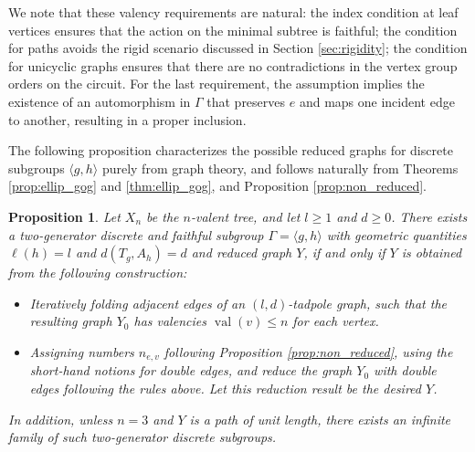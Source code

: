 \documentclass[12pt,leqno]{amsart}
\newcommand{\2}{L^2_{\rm per}(0, T)}
\newtheorem{prop}{Proposition}[section]
\newcommand{\val}{{\operatorname{val}}}
\numberwithin{equation}{section}
\numberwithin{figure}{section}
\begin{document}
We note that these valency requirements are natural: the index condition at leaf vertices ensures that the action on the minimal subtree is faithful; the condition for paths avoids the rigid scenario discussed in Section \ref{sec:rigidity}; the condition for unicyclic graphs ensures that there are no contradictions in the vertex group orders on the circuit. For the last requirement, the assumption implies the existence of an automorphism in $\Gamma$ that preserves $e$ and maps one incident edge to another, resulting in a proper inclusion.

The following proposition characterizes the possible reduced graphs for discrete subgroups $\langle g,h\rangle$ purely from graph theory, and follows naturally from Theorems \ref{prop:ellip_gog} and \ref{thm:ellip_gog}, and Proposition \ref{prop:non_reduced}.
\begin{prop}\label{char:ellip_gog}
    Let $X_n$ be the $n$-valent tree, and let $l\geq 1$ and $d\geq 0$. There exists a two-generator discrete and faithful subgroup $\Gamma = \langle g,h\rangle$ with geometric quantities $\ell(h) = l$ and $d(T_g,A_h) = d$ and reduced graph $Y$, if and only if $Y$ is obtained from the following construction:
    \begin{itemize}
        \item Iteratively folding adjacent edges of an $(l,d)$-tadpole graph, such that the resulting graph $Y_0$ has valencies $\val(v)\leq n$ for each vertex.
        \item Assigning numbers $n_{e,v}$ following Proposition \ref{prop:non_reduced}, using the short-hand notions for double edges, and reduce the graph $Y_0$ with double edges following the rules above. Let this reduction result be the desired $Y$.
    \end{itemize}
    In addition, unless $n = 3$ and $Y$ is a path of unit length, there exists an infinite family of such two-generator discrete subgroups.
\end{prop}
\end{document}
